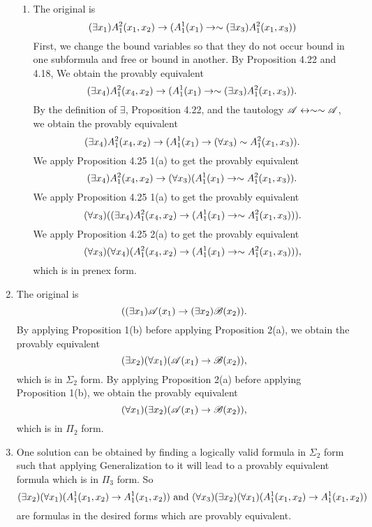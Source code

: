 \begin{enumerate}
\begin{enumerate}
      \item The original \wf{} is
        \[(\exists x_1)A^2_1(x_1, x_2) \rightarrow (A^1_1(x_1) \rightarrow \sim(\exists x_3)A^2_1(x_1, x_3))\]
        First, we change the bound variables so that they do not occur bound in one subformula and free or bound in another. By Proposition 4.22 and 4.18, We obtain the provably equivalent \wf{}
        \[(\exists x_4)A^2_1(x_4, x_2) \rightarrow (A^1_1(x_1) \rightarrow \sim(\exists x_3)A^2_1(x_1, x_3)).\]
        By the definition of \(\exists\), Proposition 4.22, and the tautology \(\mathscr{A} \leftrightarrow \sim\sim\mathscr{A}\), we obtain the provably equivalent \wf{}
        \[(\exists x_4)A^2_1(x_4, x_2) \rightarrow (A^1_1(x_1) \rightarrow (\forall x_3)\sim A^2_1(x_1, x_3)).\]
        We apply Proposition 4.25 1(a) to get the provably equivalent \wf{}
        \[(\exists x_4)A^2_1(x_4, x_2) \rightarrow (\forall x_3)(A^1_1(x_1) \rightarrow \sim A^2_1(x_1, x_3)).\]
        We apply Proposition 4.25 1(a) to get the provably equivalent \wf{}
        \[(\forall x_3)((\exists x_4)A^2_1(x_4, x_2) \rightarrow (A^1_1(x_1) \rightarrow \sim A^2_1(x_1, x_3))).\]
        We apply Proposition 4.25 2(a) to get the provably equivalent \wf{}
        \[(\forall x_3)(\forall x_4)(A^2_1(x_4, x_2) \rightarrow (A^1_1(x_1) \rightarrow \sim A^2_1(x_1, x_3))),\]
        which is in prenex form.
    \end{enumerate}

  \item %
    The original \wf{} is
    \[((\exists x_1)\mathscr{A}(x_1) \rightarrow (\exists x_2)\mathscr{B}(x_2)).\]
    By applying Proposition 1(b) before applying Proposition 2(a), we obtain the provably equivalent \wf{}
    \[(\exists x_2)(\forall x_1)(\mathscr{A}(x_1) \rightarrow \mathscr{B}(x_2)),\]
    which is in \(\Sigma_2\) form. By applying Proposition 2(a) before applying Proposition 1(b), we obtain the provably equivalent \wf{}
    \[(\forall x_1)(\exists x_2)(\mathscr{A}(x_1) \rightarrow \mathscr{B}(x_2)),\]
    which is in \(\Pi_2\) form.

  \item %
    One solution can be obtained by finding a logically valid formula in \(\Sigma_2\) form such that applying Generalization to it will lead to a provably equivalent formula which is in \(\Pi_3\) form. So
    \[(\exists x_2)(\forall x_1)(A^1_1(x_1, x_2) \rightarrow A^1_1(x_1, x_2)) \text{ and }(\forall x_3)(\exists x_2)(\forall x_1)(A^1_1(x_1, x_2) \rightarrow A^1_1(x_1, x_2))\]
    are formulas in the desired forms which are provably equivalent.
\end{enumerate}
